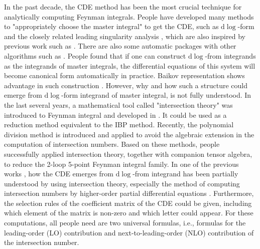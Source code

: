 \documentclass[a4paper,11pt]{article}
\newcommand{\nd}{\mathrm{d}}
\begin{document}
In the past decade, the CDE method has been the most crucial technique for analytically computing Feynman integrals. People have developed many methods to "appropriately choose the master integral" to get the CDE,  such as $\nd \log$-form and the closely related leading singularity analysis \cite{Henn:2013pwa, Chen:2020uyk, Chen:2022lzr, Chicherin:2018old, Bern:2014kca, Henn:2020lye, Dlapa:2021qsl}, which are also inspired by previous work such as \cite{Arkani-Hamed:2010pyv, Arkani-Hamed:2012zlh}. There are also some automatic packages with other algorithms such as \cite{Dlapa:2020cwj, Lee:2020zfb, Prausa:2017ltv, Gituliar:2017vzm, Meyer:2017joq, Meyer:2016slj}. People found that if one can construct $\nd \log$-from integrands as the integrands of master integrals,  the differential equations of this system will become canonical form automatically in practice. Baikov representation \cite{Baikov:1996iu} shows advantage in such construction \cite{Chicherin:2018old,Chen:2020uyk, Chen:2022lzr}. However,  why and how such a structure could emerge from $\nd \log$-form integrand of master integral, is not fully understood. In the last several years, a mathematical tool called "intersection theory" was introduced to Feynman integral and developed in \cite{Mastrolia:2018uzb, Frellesvig:2019uqt, Mizera:2019ose, Matsubara-Heo:2020lzo, Chestnov:2022xsy, Weinzierl:2020xyy, Chen:2020uyk,  Chen:2022lzr, Jiang:2023oyq, Jiang:2023qnl, Crisanti:2024onv, Frellesvig:2020qot, Mizera:2019vvs, Chestnov:2022alh, Caron-Huot:2021xqj, Caron-Huot:2021iev, Giroux:2022wav, De:2023xue,Duhr:2024rxe,Chen:2023kgw,Fontana:2023amt,Brunello:2023rpq,Brunello:2024tqf}. It could be used as a reduction method equivalent to the IBP method. Recently, the polynomial division method is introduced \cite{Fontana:2023amt} and applied \cite{Brunello:2023rpq} to avoid the algebraic extension in the computation of intersection numbers. Based on these methods, people \cite{Brunello:2024tqf} successfully applied intersection theory, together with companion tensor algebra, to reduce the 2-loop 5-point Feynman integral family. In one of the previous works \cite{Chen:2023kgw}, how the CDE emerges from $\nd \log$-from integrand has been partially understood by using intersection theory, especially the method of computing intersection numbers by higher-order partial differential equations \cite{Chestnov:2022xsy}. Furthermore, the selection rules of the coefficient matrix of the CDE could be given, including which element of the matrix is non-zero and which letter could appear.
For these computations, all people need are two universal formulas, i.e., formulas for the leading-order (LO) contribution and next-to-leading-order (NLO) contribution of the intersection number.
\end{document}
